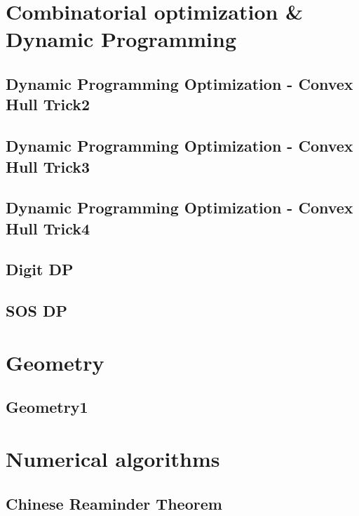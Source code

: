 \section{Combinatorial optimization & Dynamic Programming}
\subsection{Dynamic Programming Optimization - Convex Hull Trick2}
\raggedbottom
\hrulefill
\subsection{Dynamic Programming Optimization - Convex Hull Trick3}
\raggedbottom
\hrulefill
\subsection{Dynamic Programming Optimization - Convex Hull Trick4}
\raggedbottom
\hrulefill
\subsection{Digit DP}
\raggedbottom
\hrulefill
\subsection{SOS DP}
\raggedbottom
\hrulefill

\section{Geometry}
\subsection{Geometry1}
\raggedbottom
\hrulefill

\section{Numerical algorithms}
\subsection{Chinese Reaminder Theorem}
\raggedbottom
\hrulefill
